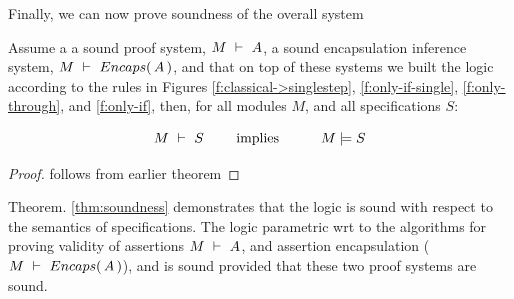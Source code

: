 \vspace{1cm}

Finally, we can now prove soundness of the overall system

\begin{theorem}[Soundness]
\label{thm:soundness}
Assume a a sound \SpecO proof system, $M\ \vdash\ A$, 
a sound encapsulation inference system, $M\ \vdash\ {Encaps(\, A\, )}$,
 and  that on top of these systems we built
 the \SpecLang logic according to the rules in Figures \ref{f:classical->singlestep},  \ref{f:only-if-single}, 
 \ref{f:only-through},  and \ref{f:only-if},   then, for    all modules $M$, and all \SpecLang specifications  $S$:
 
 $$\proves{M}{S}\ \ \ \ \ \ \ \mbox{implies}\ \ \ \ \ \  \ \ \ \satisfies{M}{S}$$
\end{theorem}

\begin{proof}
follows from earlier theorem
\end{proof}
 


Theorem. \ref{thm:soundness} demonstrates 
 that the   \SpecLang logic is sound with respect to the semantics of \SpecLang specifications.
 The \SpecLang logic parametric wrt to the algorithms for proving validity of assertions
 $M\ \vdash\ A$, and 
 assertion encapsulation ($M\ \vdash\ {Encaps(\, A\, )}$), and is sound
 provided that these two proof systems are sound.

